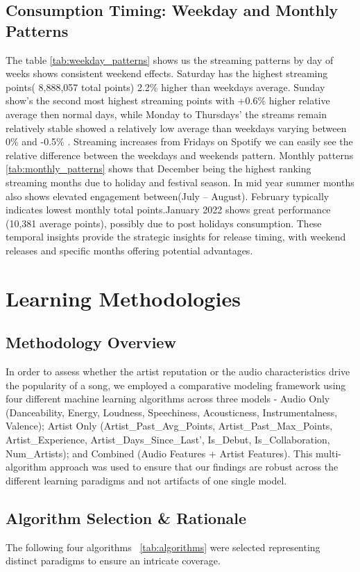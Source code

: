 \documentclass{article}
\begin{document}
\subsection{Consumption Timing: Weekday and Monthly Patterns}
The table \ref{tab:weekday_patterns} shows us the streaming patterns by day of weeks shows consistent weekend effects. Saturday has the highest streaming points( 8,888,057 total points) 2.2\% higher than weekdays average. Sunday show’s the second most highest streaming points with +0.6\% higher relative average then normal days, while Monday to Thursdays’ the streams remain relatively stable showed a relatively low average than weekdays varying between 0\% and -0.5\% . Streaming increases from Fridays on Spotify we can easily see the relative difference between the weekdays and weekends pattern. Monthly patterns \ref{tab:monthly_patterns} shows that December being the highest ranking streaming months due to holiday and festival season. In mid year summer months also shows elevated engagement between(July – August). February typically indicates lowest monthly total points.January 2022 shows great performance (10,381 average points), possibly due to post holidays consumption. These temporal insights provide the strategic insights for release timing, with weekend releases and specific months offering potential advantages.

\vspace{-0.2cm}
\section{Learning Methodologies}
\subsection{Methodology Overview}
In order to assess whether the artist reputation or the audio characteristics drive the popularity of a song, we employed a comparative modeling framework using four different machine learning algorithms across three models - Audio Only (Danceability, Energy, Loudness, Speechiness, Acousticness, Instrumentalness, Valence); Artist Only (Artist\_Past\_Avg\_Points, Artist\_Past\_Max\_Points, Artist\_Experience, Artist\_Days\_Since\_Last', Is\_Debut, Is\_Collaboration, Num\_Artists); and Combined (Audio Features + Artist Features). This multi-algorithm approach was used to ensure that our findings are robust across the different learning paradigms and not artifacts of one single model.

\subsection{Algorithm Selection \& Rationale}
The following four algorithms ~\ref{tab:algorithms} were selected representing distinct paradigms to ensure an intricate coverage. 
\end{document}
